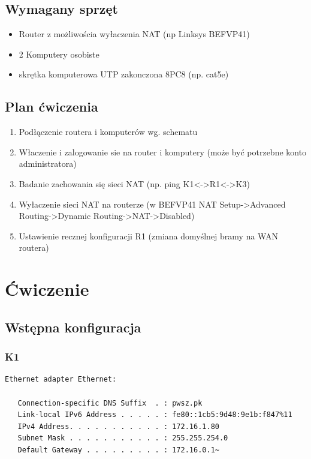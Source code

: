 \documentclass[11pt]{article}
\begin{document}
\subsection{Wymagany sprzęt}
\label{sec:orgd751965}
\begin{itemize}
\item Router z możliwościa wyłaczenia NAT (np Linksys BEFVP41)
\item 2 Komputery osobiste
\item skrętka komputerowa UTP zakonczona 8PC8 (np. cat5e)
\end{itemize}

\subsection{Plan ćwiczenia}
\label{sec:org1cd9d97}
\begin{enumerate}
\item Podłączenie routera i komputerów wg. schematu
\item Właczenie i zalogowanie sie na router i komputery (może być potrzebne konto administratora)
\item Badanie zachowania się sieci NAT (np. ping K1<->R1<->K3)
\item Wyłaczenie sieci NAT na routerze (w BEFVP41 NAT Setup->Advanced Routing->Dynamic Routing->NAT->Disabled)
\item Ustawienie recznej konfiguracji R1 (zmiana domyślnej bramy na WAN routera)
\end{enumerate}


\section{Ćwiczenie}
\label{sec:org39bd9f4}
\subsection{Wstępna konfiguracja}
\label{sec:org7daec33}
\subsubsection{K1}
\label{sec:orgbe5b300}
\begin{verbatim}
Ethernet adapter Ethernet:

   Connection-specific DNS Suffix  . : pwsz.pk
   Link-local IPv6 Address . . . . . : fe80::1cb5:9d48:9e1b:f847%11
   IPv4 Address. . . . . . . . . . . : 172.16.1.80
   Subnet Mask . . . . . . . . . . . : 255.255.254.0
   Default Gateway . . . . . . . . . : 172.16.0.1~
\end{verbatim}
\end{document}
